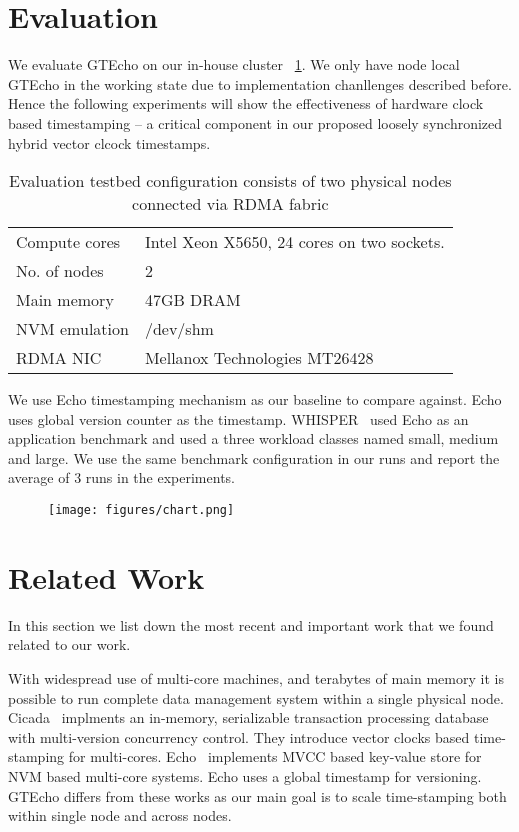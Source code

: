 \section{Evaluation}

We evaluate GTEcho on our in-house cluster ~\ref{tab:eval}. We only have node local GTEcho in the working
state due to implementation chanllenges described before. Hence the following experiments 
will show the effectiveness of hardware clock based timestamping -- a critical component 
in our proposed loosely synchronized hybrid vector clcock timestamps.

\begin{table}[]
	\begin{tabular}{l|l}
		\hline
		Compute cores	&  Intel Xeon X5650, 24 cores on two sockets. \\
		No. of nodes	  &  2  \\
		Main memory	  &  47GB DRAM \\
		NVM emulation & /dev/shm \\
		RDMA NIC		  & Mellanox Technologies MT26428  \\
		\hline
	\end{tabular}
	\caption{Evaluation testbed configuration consists of two physical nodes connected via RDMA fabric} 
	\label{tab:eval} 
\end{table}

We use Echo timestamping mechanism as our baseline to compare against. Echo uses global version counter as the timestamp. 
WHISPER~\cite{whisper} used Echo as an application benchmark and used a three workload classes named small, medium and large.
We use the same benchmark configuration in our runs and report the average of 3 runs in the experiments.

\begin{figure}[]   
	\centering
	\texttt{[image: figures/chart.png]} 
	\caption{\small } 
	\label{fig:eval} 
\end{figure}





\section{Related Work}
In this section we list down the most recent and important work that we 
found related to our work. 

With widespread use of multi-core machines, and terabytes of main memory
it is possible to run complete data management system within a single 
physical node. Cicada~\cite{cicada} implments an in-memory, serializable
transaction processing database with multi-version concurrency control. They
introduce vector clocks based time-stamping for multi-cores. Echo~\cite{echo}
implements MVCC based key-value store for NVM based multi-core systems. Echo 
uses a global timestamp for versioning. GTEcho differs from these works as
our main goal is to scale time-stamping both within single node and across nodes.

